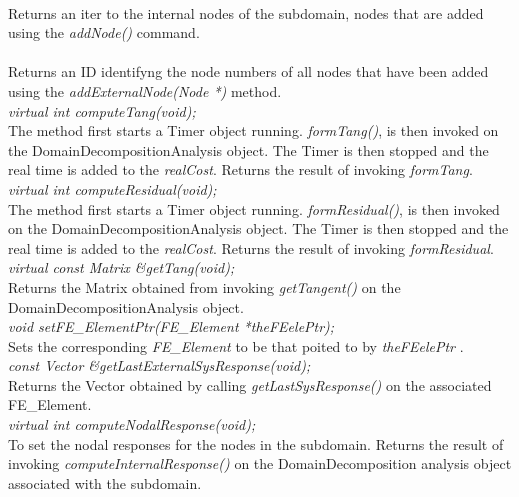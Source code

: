  \\
Returns an iter to the internal nodes of the subdomain, nodes that are
added using the {\em addNode()} command.\\

 \\
Returns an ID identifyng the node numbers of all nodes that have been
added using the {\em addExternalNode(Node *)} method. \\


{\em virtual int computeTang(void);}\\
The method first starts a Timer object running. {\em formTang()}, 
is then invoked on the DomainDecompositionAnalysis object. The
Timer is then stopped and the real time is added to the {\em realCost}. 
Returns the result of invoking {\em formTang}. \\

{\em virtual int computeResidual(void);}\\
The method first starts a Timer object running. {\em formResidual()}, 
is then invoked on the DomainDecompositionAnalysis object. The
Timer is then stopped and the real time is added to the {\em realCost}. 
Returns the result of invoking {\em formResidual}. \\

{\em virtual const Matrix \&getTang(void);    }\\
Returns the Matrix obtained from invoking {\em getTangent()} on
the DomainDecompositionAnalysis object. \\


{\em void setFE\_ElementPtr(FE\_Element *theFEelePtr);}\\
Sets the corresponding {\em FE\_Element} to be that poited to by {\em
theFEelePtr} . \\

{\em const Vector \&getLastExternalSysResponse(void);}\\
Returns the Vector obtained by calling {\em getLastSysResponse()} on
the associated FE\_Element. \\

{\em virtual int computeNodalResponse(void);}\\
To set the nodal responses for the nodes in the subdomain. Returns the
result of invoking {\em computeInternalResponse()} on the DomainDecomposition
analysis object associated with the subdomain.\\ 

